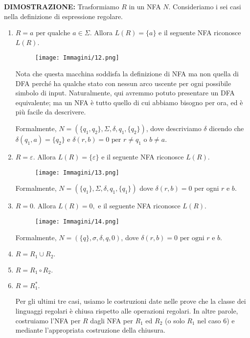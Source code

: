 \documentclass{article}
\begin{document}
\textbf{DIMOSTRAZIONE:}
Trasformiamo $R$ in un NFA $N$. Consideriamo i sei casi nella definizione di espressione regolare.
\begin{enumerate}
    \item $R = a \text{ per qualche } a \in \Sigma.$ Allora $L(R) = \{a\}$ e il seguente NFA riconosce $L(R)$. 
        \begin{figure}[H]
            \centering
            \texttt{[image: Immagini/12.png]}
            \label{fig:your_image1}
        \end{figure}
        Nota che questa macchina soddisfa la definizione di NFA ma non quella di DFA perché ha qualche stato con nessun arco uscente per ogni possibile simbolo di input. Naturalmente, qui avremmo potuto presentare un DFA equivalente; ma un NFA è tutto quello di cui abbiamo bisogno per ora, ed è più facile da descrivere.
        
        Formalmente, $N = (\{q_{1},q_{2}\},\Sigma,\delta,q_{1},\{q_{2}\})$, dove descriviamo $\delta$ dicendo che $\delta(q_{1},a) = \{q_2\}$ e $\delta(r,b) = 0 \text{ per }r\neq q_{1}$ o $b \neq a.$
    \item $R = \varepsilon.$ Allora $L(R) = \{\varepsilon\}$ e il seguente NFA riconosce $L(R)$.
    \begin{figure}[H]
        \centering
        \texttt{[image: Immagini/13.png]}
        \label{fig:your_image1}
    \end{figure}
    Formalmente, $N = (\{q_{1}\},\Sigma,\delta,q_{1},\{q_{1}\})$ dove $\delta(r,b) = 0$ per ogni $r$ e $b$.
    \item $R = 0.$ Allora $L(R) = 0,$ e il seguente NFA riconosce $L(R)$.
    \begin{figure}[H]
        \centering
        \texttt{[image: Immagini/14.png]}
        \label{fig:your_image}
    \end{figure}
    Formalmente, $N = (\{q\},\sigma,\delta,q,0)$, dove $\delta(r,b) = 0 \text{ per ogni } r \text{ e } b.$
    \item $R = R_{1}\cup R_{2}.$
    \item $R = R_{1}\circ R_{2}.$
    \item $R = R^{*}_{1}.$
    
    Per gli ultimi tre casi, usiamo le costruzioni date nelle prove che la classe dei linguaggi regolari è chiusa rispetto alle operazioni regolari. In altre parole, costruiamo l'NFA per $R$ dagli NFA per $R_{1}$ ed $R_{2}$ (o solo $R_{1}$ nel caso 6) e mediante l'appropriata costruzione della chiusura.
\end{enumerate}
\end{document}
